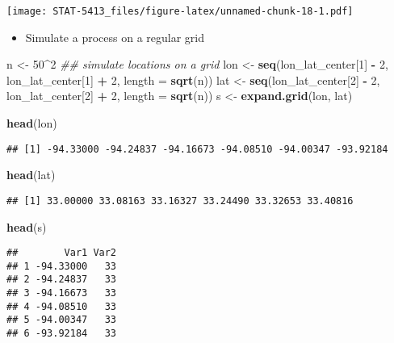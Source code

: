 \documentclass[]{book}
\newenvironment{Shaded}{\begin{snugshade}}{\end{snugshade}}
\newcommand{\CommentTok}[1]{\textcolor[rgb]{0.56,0.35,0.01}{\textit{#1}}}
\newcommand{\DataTypeTok}[1]{\textcolor[rgb]{0.13,0.29,0.53}{#1}}
\newcommand{\DecValTok}[1]{\textcolor[rgb]{0.00,0.00,0.81}{#1}}
\newcommand{\KeywordTok}[1]{\textcolor[rgb]{0.13,0.29,0.53}{\textbf{#1}}}
\newcommand{\NormalTok}[1]{#1}
\newcommand{\OperatorTok}[1]{\textcolor[rgb]{0.81,0.36,0.00}{\textbf{#1}}}
\newcommand{\StringTok}[1]{\textcolor[rgb]{0.31,0.60,0.02}{#1}}
\providecommand{\tightlist}{%
  \setlength{\itemsep}{0pt}\setlength{\parskip}{0pt}}
\begin{document}
\texttt{[image: STAT-5413\_files/figure-latex/unnamed-chunk-18-1.pdf]}

\begin{itemize}
\tightlist
\item
  Simulate a process on a regular grid
\end{itemize}

\begin{Shaded}
\begin{Highlighting}[]
\NormalTok{n <-}\StringTok{ }\DecValTok{50}\OperatorTok{^}\DecValTok{2}
\CommentTok{## simulate locations on a grid}
\NormalTok{lon  <-}\StringTok{ }\KeywordTok{seq}\NormalTok{(lon_lat_center[}\DecValTok{1}\NormalTok{] }\OperatorTok{-}\StringTok{ }\DecValTok{2}\NormalTok{, lon_lat_center[}\DecValTok{1}\NormalTok{] }\OperatorTok{+}\StringTok{ }\DecValTok{2}\NormalTok{, }\DataTypeTok{length =} \KeywordTok{sqrt}\NormalTok{(n))}
\NormalTok{lat  <-}\StringTok{ }\KeywordTok{seq}\NormalTok{(lon_lat_center[}\DecValTok{2}\NormalTok{] }\OperatorTok{-}\StringTok{ }\DecValTok{2}\NormalTok{, lon_lat_center[}\DecValTok{2}\NormalTok{] }\OperatorTok{+}\StringTok{ }\DecValTok{2}\NormalTok{, }\DataTypeTok{length =} \KeywordTok{sqrt}\NormalTok{(n))}
\NormalTok{s <-}\StringTok{ }\KeywordTok{expand.grid}\NormalTok{(lon, lat)}

\KeywordTok{head}\NormalTok{(lon)}
\end{Highlighting}
\end{Shaded}

\begin{verbatim}
## [1] -94.33000 -94.24837 -94.16673 -94.08510 -94.00347 -93.92184
\end{verbatim}

\begin{Shaded}
\begin{Highlighting}[]
\KeywordTok{head}\NormalTok{(lat)}
\end{Highlighting}
\end{Shaded}

\begin{verbatim}
## [1] 33.00000 33.08163 33.16327 33.24490 33.32653 33.40816
\end{verbatim}

\begin{Shaded}
\begin{Highlighting}[]
\KeywordTok{head}\NormalTok{(s)}
\end{Highlighting}
\end{Shaded}

\begin{verbatim}
##        Var1 Var2
## 1 -94.33000   33
## 2 -94.24837   33
## 3 -94.16673   33
## 4 -94.08510   33
## 5 -94.00347   33
## 6 -93.92184   33
\end{verbatim}
\end{document}
